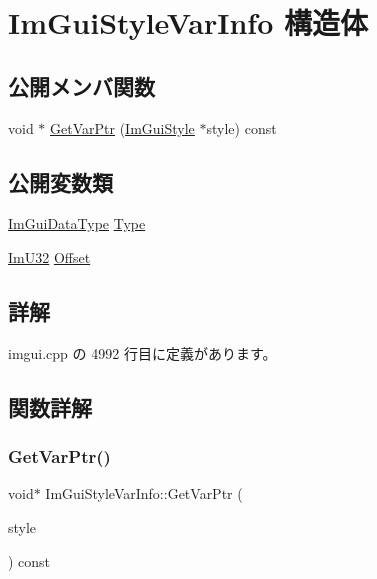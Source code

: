 \hypertarget{struct_im_gui_style_var_info}{}\section{Im\+Gui\+Style\+Var\+Info 構造体}
\label{struct_im_gui_style_var_info}
\subsection*{公開メンバ関数}
\begin{DoxyCompactItemize}
\item 
void $\ast$ \mbox{\hyperlink{struct_im_gui_style_var_info_a92aebc5f0d8b2b43b61dbcaf992b5643}{Get\+Var\+Ptr}} (\mbox{\hyperlink{struct_im_gui_style}{Im\+Gui\+Style}} $\ast$style) const
\end{DoxyCompactItemize}
\subsection*{公開変数類}
\begin{DoxyCompactItemize}
\item 
\mbox{\hyperlink{imgui__internal_8h_a22f27475affc8d8a1f2407887e5e1d19}{Im\+Gui\+Data\+Type}} \mbox{\hyperlink{struct_im_gui_style_var_info_a62f42d2bb7b71b7530493e16e622cb81}{Type}}
\item 
\mbox{\hyperlink{imgui_8h_a118cff4eeb8d00e7d07ce3d6460eed36}{Im\+U32}} \mbox{\hyperlink{struct_im_gui_style_var_info_ae900d6a02166d3d0433c18b95aec10e8}{Offset}}
\end{DoxyCompactItemize}


\subsection{詳解}


 imgui.\+cpp の 4992 行目に定義があります。



\subsection{関数詳解}
\mbox{\label{struct_im_gui_style_var_info_a92aebc5f0d8b2b43b61dbcaf992b5643}} 
\subsubsection{\texorpdfstring{Get\+Var\+Ptr()}{GetVarPtr()}}
{\footnotesize\ttfamily void$\ast$ Im\+Gui\+Style\+Var\+Info\+::\+Get\+Var\+Ptr (\begin{DoxyParamCaption}\item[{\mbox{\hyperlink{struct_im_gui_style}{Im\+Gui\+Style}} $\ast$}]{style }\end{DoxyParamCaption}) const\hspace{0.3cm}{\ttfamily [inline]}}




